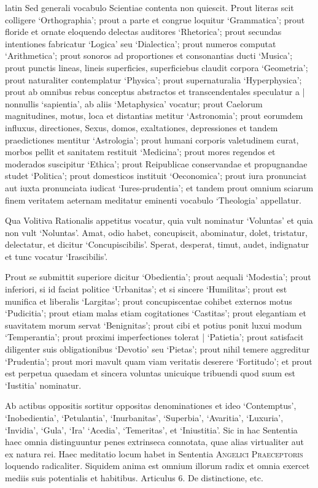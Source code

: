 \begin{otherlanguage*}{latin}
\pstart
Sed generali vocabulo Scientiae contenta non quiescit. Prout literas scit colligere `Orthographia'; prout a parte et congrue loquitur `Grammatica'; prout floride et ornate eloquendo delectas auditores `Rhetorica'; prout secundas intentiones fabricatur `Logica' seu `Dialectica'; prout numeros computat `Arithmetica'; prout sonoros ad proportiones et consonantias ducti `Musica'; prout punctis lineas, lineis superficies, superficiebus claudit corpora `Geometria'; prout naturaliter contemplatur `Physica'; prout supernaturalia `Hyperphysica'; prout ab omnibus rebus conceptus abstractos et transcendentales speculatur a \textnormal{|} nonnullis `sapientia', ab aliis `Metaphysica' vocatur; prout Caelorum magnitudines, motus, loca et distantias metitur `Astronomia'; prout eorumdem influxus, directiones, Sexus, domos, exaltationes, depressiones et tandem praedictiones mentitur `Astrologia'; prout humani corporis valetudinem curat, morbos pellit et sanitatem restituit `Medicina'; prout mores regendos et moderados suscipitur `Ethica'; prout Reipublicae conservandae et propugnandae studet `Politica'; prout domesticos instituit `Oeconomica'; prout iura pronunciat aut iuxta  pronunciata iudicat `Iures-prudentia'; et tandem prout omnium sciarum finem veritatem aeternam meditatur eminenti vocabulo `Theologia' appellatur. 
\pend

\pstart
Qua Volitiva Rationalis appetitus vocatur, quia vult nominatur `Voluntas' et quia non vult `Noluntas'. Amat, odio habet, concupiscit, abominatur, dolet, tristatur, delectatur, et dicitur `Concupiscibilis'. Sperat, desperat, timut, audet, indignatur et tunc vocatur `Irascibilis'. 
\pend

\pstart
Prout se submittit superiore dicitur `Obedientia'; prout aequali `Modestia'; prout inferiori, si id faciat politice `Urbanitas'; et si sincere `Humilitas'; prout est munifica et liberalis `Largitas'; prout concupiscentae cohibet externos motus `Pudicitia'; prout etiam malas etiam cogitationes `Castitas'; prout elegantiam et suavitatem morum servat `Benignitas'; prout cibi et potius ponit luxui modum `Temperantia'; prout proximi imperfectiones tolerat \textnormal{|} `Patietia'; prout satisfacit diligenter suis obligationibus `Devotio' seu `Pietas'; prout nihil temere aggreditur `Prudentia'; prout mori mavult quam viam veritatis deserere `Fortitudo'; et prout est perpetua quaedam et sincera voluntas unicuique tribuendi quod suum est `Iustitia' nominatur. 
\pend

\pstart
Ab actibus oppositis sortitur oppositas denominationes et ideo `Contemptus', `Inobedientia', `Petulantia', `Inurbanitas', `Superbia', `Avaritia', `Luxuria', `Invidia', `Gula', `Ira' `Acedia', `Temeritas', et `Iniustitia'. Sic in hac Sententia haec omnia distinguuntur penes extrinseca connotata, quae alias virtualiter aut ex natura rei. Haec meditatio locum habet in Sententia \textsc{Angelici Praeceptoris} loquendo radicaliter. Siquidem anima est omnium illorum radix et omnia exercet mediis suis potentialis et habitibus. Articulus 6. De distinctione, etc. 
\pend


\end{otherlanguage*}
